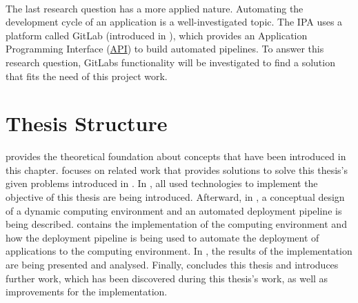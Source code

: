\paragraph{}
The last research question has a more applied nature.
Automating the development cycle of an application is a well-investigated topic.
The IPA uses a platform called GitLab (introduced in ), which provides an Application Programming Interface (\hyperlink{abbr:api}{API}) to build automated pipelines.
To answer this research question, GitLabs functionality will be investigated to find a solution that fits the need of this project work.


\section{Thesis Structure}
 provides the theoretical foundation about concepts that have been introduced in this chapter.
 focuses on related work that provides solutions to solve this thesis's given problems introduced in .
In , all used technologies to implement the objective of this thesis are being introduced.
Afterward, in , a conceptual design of a dynamic computing environment and an automated deployment pipeline is being described.
 contains the implementation of the computing environment and how the deployment pipeline is being used to automate the deployment of applications to the computing environment.
In , the results of the implementation are being presented and analysed.
Finally,  concludes this thesis and introduces further work, which has been discovered during this thesis's work, as well as improvements for the implementation.
